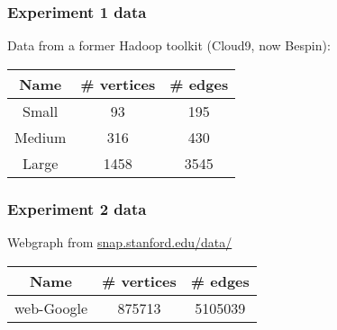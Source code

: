 \begin{frame}
\frametitle{Experiment 1 data}
Data from a former Hadoop toolkit (Cloud9, now Bespin):
\begin{table}
\centering
\begin{tabular}{|c|c|c|}
\hline
Name & \# vertices & \# edges\\
\hline
Small & 93 & 195\\
\hline
Medium & 316 & 430\\
\hline
Large & 1458 & 3545\\
\hline
\end{tabular}
\end{table}
\end{frame}

\begin{frame}
\frametitle{Experiment 2 data}
Webgraph from \url{snap.stanford.edu/data/}
\begin{table}
\centering
\begin{tabular}{|c|c|c|}
\hline
Name & \# vertices & \# edges\\
\hline
web-Google & 875713 & 5105039\\
\hline
\end{tabular}
\end{table}
\end{frame}
